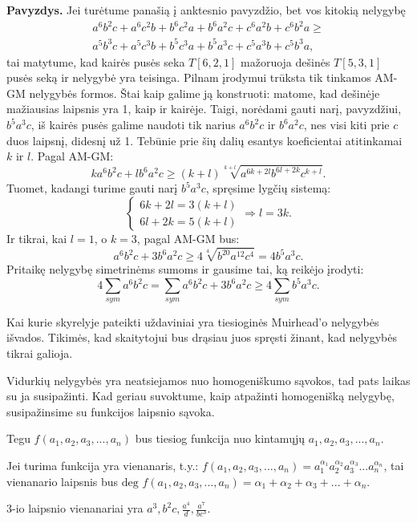 \noindent \textbf{Pavyzdys.} Jei turėtume panašią į anktesnio pavyzdžio,
bet vos kitokią nelygybę
\begin{eqnarray*}a^6b^2c+a^6c^2b+b^6c^2a+b^6a^2c+c^6a^2b+c^6b^2a\geq
  \\a^5b^3c+a^5c^3b+b^5c^3a+b^5a^3c+c^5a^3b+c^5b^3a,
\end{eqnarray*}
tai matytume, kad kairės pusės seka $T[6,2,1]$ mažoruoja dešinės $T[5,3,1]$
pusės seką ir nelygybė yra teisinga. Pilnam įrodymui trūksta tik tinkamos
AM-GM nelygybės formos. Štai kaip galime ją konstruoti: matome, kad
dešinėje mažiausias laipsnis yra 1, kaip ir kairėje. Taigi, norėdami gauti
narį, pavyzdžiui, $b^5a^3c$, iš kairės pusės galime naudoti tik narius
$a^6b^2c$ ir $b^6a^2c$, nes visi kiti prie $c$ duos laipsnį, didesnį už 1.
Tebūnie prie šių dalių esantys koeficientai atitinkamai $k$ ir $l$. Pagal
AM-GM: $$ka^6b^2c+lb^6a^2c\geq(k+l)\sqrt[k+l]{a^{6k+2l}b^{6l+2k}c^{k+l}}.$$
Tuomet, kadangi turime gauti narį $b^5a^3c$, spręsime lygčių sistemą:
  $$\left\{
  \begin{array}{lr}
    6k+2l=3(k+l)\\
    6l+2k=5(k+l)
  \end{array}
  \right.
  \Rightarrow l=3k.$$ Ir tikrai, kai $l=1$, o $k=3$, pagal AM-GM bus:
  $$a^6b^2c+3b^6a^2c\geq4\sqrt[4]{b^{20}a^{12}c^4}=4b^5a^3c.$$ Pritaikę
  nelygybę simetrinėms sumoms ir gausime tai, ką reikėjo įrodyti:
  $$4\sum_{sym}{a^6b^2c}=\sum_{sym}{a^6b^2c+3b^6a^2c}\geq4\sum_{sym}{b^5a^3c}.$$

Kai kurie skyrelyje pateikti uždaviniai yra tiesioginės Muirhead'o
nelygybės išvados. Tikimės, kad skaitytojui bus drąsiau juos spręsti
žinant, kad nelygybės tikrai galioja.

Vidurkių nelygybės yra neatsiejamos nuo homogeniškumo sąvokos, tad pats
laikas su ja susipažinti. Kad geriau suvoktume, kaip atpažinti homogenišką
nelygybę, susipažinsime su funkcijos laipsnio sąvoka.

Tegu $f(a_{1},a_{2},a_{3},...,a_{n})$ bus tiesiog funkcija nuo kintamųjų
$a_{1},a_{2},a_{3},...,a_{n}$.

Jei turima funkcija yra vienanaris, t.y.:
$f(a_{1},a_{2},a_{3},...,a_{n})=a_{1}^{\alpha_{1}}a_{2}^{\alpha_{2}}a_{3}^{\alpha_{3}}...a_{n}^{\alpha_{n}}$,
tai vienanario laipsnis bus $\text{deg } f(a_{1},a_{2},a_{3},...,a_{n})=\alpha_{1}+\alpha_{2}+\alpha_{3}+...+\alpha_{n}$.
\begin{pav} 3-io laipsnio vienanariai yra
    $a^3,b^2c,\frac{a^4}{d},\frac{a^7}{bc^3}$.
\end{pav}

